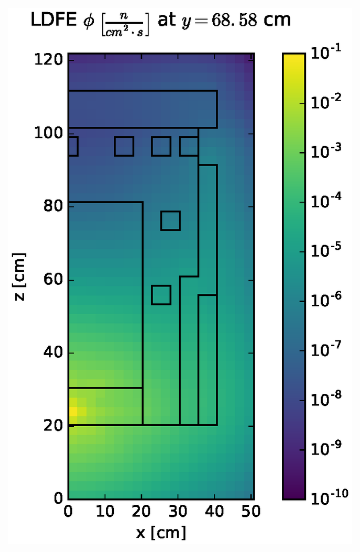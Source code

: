 \documentclass{article} %
\begin{document}
\begin{figure}[!htb]
\begin{subfigure}{0.4\textwidth}
\includegraphics[max height=0.445\textheight]
{img/dlvn-fwd-flux-ldfe01.eps}
\end{subfigure} ~
\begin{subfigure}{0.4\textwidth}

\end{subfigure}
\end{figure}
\end{document}
